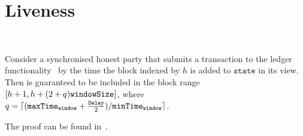 \section{Liveness} \ \\

\begin{proposition}
  \label{prop:liveness}
  Consider a synchronised honest party that submits a transaction \tx to the
  ledger functionality~\cite{genesis} by the time the block indexed by $h$ is
  added to $\texttt{state}$ in its view. Then \tx is guaranteed to be included
  in the block range $[h+1, h + (2 + q) \texttt{windowSize}]$, where $q = \lceil
  (\texttt{maxTime}_\texttt{window} + \frac{\texttt{Delay}}{2})/ \texttt{minTime}_\texttt{window} \rceil$.
\end{proposition}

The proof can be found in~\cite{DBLP:conf/csfw/KiayiasL20}.
